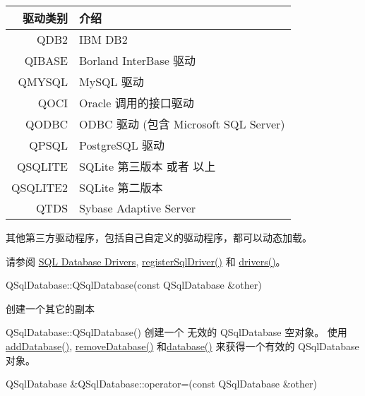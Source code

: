 \begin{tabular}{|r|l|}
	\hline	
	驱动类别& 介绍\\
	\hline
	QDB2&	IBM DB2\\
		\hline
	QIBASE	&Borland InterBase 驱动\\
		\hline
	QMYSQL	&MySQL 驱动\\
		\hline
	QOCI	&Oracle 调用的接口驱动\\
		\hline
	QODBC	&ODBC 驱动 (包含 Microsoft SQL Server)\\
		\hline
	QPSQL	&PostgreSQL 驱动\\
		\hline
	QSQLITE	&SQLite 第三版本 或者 以上\\
		\hline
	QSQLITE2&	SQLite 第二版本\\
		\hline
	QTDS	&Sybase Adaptive Server\\
	\hline
\end{tabular}

其他第三方驱动程序，包括自己自定义的驱动程序，都可以动态加载。

请参阅 \href{https://doc.qt.io/qt-5/sql-driver.html}{SQL Database Drivers}, \href{https://github.com/QtDocumentCN/QtDocumentCN/blob/master/Src/S/QSqlDatabase/QSqlDatabase.md#static-void-qsqldatabaseregistersqldriverconst-qstring-name-qsqldrivercreatorbase-creator}{registerSqlDriver()} 和 \href{https://github.com/QtDocumentCN/QtDocumentCN/blob/master/Src/S/QSqlDatabase/QSqlDatabase.md#static-qstringlist-qsqldatabasedrivers}{drivers()}。

QSqlDatabase::QSqlDatabase(const QSqlDatabase \&other)

创建一个其它的副本

QSqlDatabase::QSqlDatabase()
创建一个 无效的 QSqlDatabase 空对象。
使用\href{https://github.com/QtDocumentCN/QtDocumentCN/blob/master/Src/S/QSqlDatabase/QSqlDatabase.md#static-qsqldatabase-qsqldatabaseadddatabaseconst-qstring-type-const-qstring-connectionname--qlatin1stringdefaultconnection}{addDatabase()},  \href{https://github.com/QtDocumentCN/QtDocumentCN/blob/master/Src/S/QSqlDatabase/QSqlDatabase.md#static-void-qsqldatabaseremovedatabaseconst-qstring-connectionname}{removeDatabase()} 和\href{https://github.com/QtDocumentCN/QtDocumentCN/blob/master/Src/S/QSqlDatabase/QSqlDatabase.md#static-qsqldatabase-qsqldatabasedatabaseconst-qstring-connectionname--qlatin1stringdefaultconnection-bool-open--true}{database()} 来获得一个有效的 QSqlDatabase 对象。

QSqlDatabase \&QSqlDatabase::operator=(const QSqlDatabase \&other)

